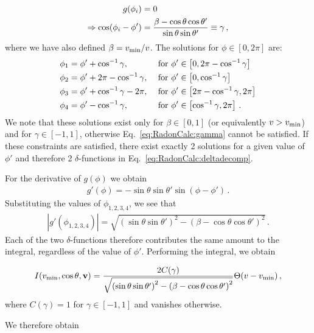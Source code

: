 \begin{align}
\label{eq:RadonCalc:gamma}
g(\phi_i) &= 0 \notag\\
\Rightarrow \cos(\phi_i - \phi') &= \frac{\beta - \cos\theta\cos\theta'}{\sin\theta \sin\theta'} \equiv \gamma\,,
\end{align}
where we have also defined $\beta = \vmin/v$. The solutions for $\phi \in [0,2\pi]$ are:
\begin{align}
\phi_1 &= \phi' + \cos^{-1}\gamma, & \textrm{ for } &  \phi' \in \left[0, 2\pi - \cos^{-1}\gamma\right] \notag\\
\phi_2 &= \phi' + 2\pi - \cos^{-1}\gamma, & \textrm{ for } & \phi' \in \left[0, \cos^{-1}\gamma\right] \notag\\
\phi_3 &= \phi' + \cos^{-1}\gamma -2\pi, & \textrm{ for } & \phi' \in \left[2\pi - \cos^{-1}\gamma, 2\pi\right] \notag\\
\phi_4 &= \phi' -\cos^{-1}\gamma, & \textrm{ for } & \phi' \in \left[\cos^{-1}\gamma, 2\pi\right] \,.
\end{align}
We note that these solutions exist only for $\beta \in \left[0,1\right]$ (or equivalently $v > \vmin$) and for $\gamma \in [-1,1]$, otherwise Eq.~\ref{eq:RadonCalc:gamma} cannot be satisfied. If these constraints are satisfied, there exist exactly 2 solutions for a given value of $\phi'$ and therefore 2 $\delta$-functions in Eq.~\ref{eq:RadonCalc:deltadecomp}.

For the derivative of $g(\phi)$ we obtain
\begin{align}
g'(\phi) = -\sin\theta\sin\theta'\sin(\phi-\phi')\,.
\end{align}
Substituting the values of $\phi_{1,2,3,4}$, we see that
\begin{align}
|g'(\phi_{1,2,3,4})| = \sqrt{\left(\sin\theta\sin\theta'\right)^2 - \left(\beta - \cos\theta\cos\theta'\right)^2}\,.
\end{align}
Each of the two $\delta$-functions therefore contributes the same amount to the integral, regardless of the value of $\phi'$. Performing the integral, we obtain

\begin{equation}
I(\vmin, \cos\theta, \mathbf{v}) = \frac{2 C(\gamma)}{\sqrt{\left(\sin\theta\sin\theta'\right)^2 - \left(\beta - \cos\theta\cos\theta'\right)^2}}\Theta(v - \vmin)\,,
\end{equation}
where $C(\gamma) = 1$ for $\gamma \in [-1,1]$ and vanishes otherwise.

We therefore obtain

